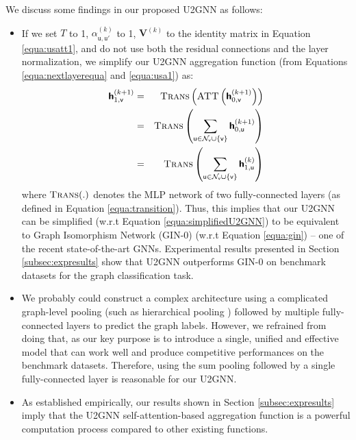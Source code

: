 \documentclass[twoside,leqno,twocolumn]{article}
\newcommand{\citep}{\cite}
\begin{document}
We discuss some findings in our proposed U2GNN as follows:

\begin{itemize}


\item If we set $T$ to 1, $\alpha^{(k)}_{\mathsf{u},\mathsf{u}'}$ to 1, $\boldsymbol{V}^{(k)}$ to the identity matrix in Equation \ref{equa:usatt1}, and do not use both the residual connections and the layer normalization, we simplify our U2GNN aggregation function (from Equations \ref{equa:nextlayerequa} and \ref{equa:usa1}) as:
\begin{eqnarray} 
\boldsymbol{\mathsf{h}}^{(k+1)}_{1,\mathsf{v}} &=&  \textsc{Trans}\left( \textsc{ATT}\left(\boldsymbol{\mathsf{h}}^{(k+1)}_{0,\mathsf{v}}\right)\right) \nonumber \\
&=& \textsc{Trans}\left(\sum_{\mathsf{u} \in \mathcal{N}_\mathsf{v}\cup\left\{\mathsf{v}\right\}}\boldsymbol{\mathsf{h}}^{(k+1)}_{0,\mathsf{u}}\right) \nonumber \\ 
&=& \textsc{Trans}\left(\sum_{\mathsf{u} \in \mathcal{N}_\mathsf{v}\cup\left\{\mathsf{v}\right\}}\boldsymbol{\mathsf{h}}^{(k)}_{1,\mathsf{u}}\right)
\label{equa:simplifiedU2GNN}
\end{eqnarray}
where $\textsc{Trans}(.)$ denotes the MLP network of two fully-connected layers (as defined in Equation \ref{equa:transition}). Thus, this implies that our U2GNN can be simplified (w.r.t Equation \ref{equa:simplifiedU2GNN}) to be equivalent to Graph Isomorphism Network (GIN-0) \citep{xu2019powerful} (w.r.t Equation \ref{equa:gin}) -- one of the recent state-of-the-art GNNs.
Experimental results presented in Section \ref{subsec:expresults} show that U2GNN outperforms GIN-0 on benchmark datasets for the graph classification task.


\item We probably could construct a complex architecture using a complicated graph-level pooling (such as hierarchical pooling \citep{cangea2018towards}) followed by multiple fully-connected layers \citep{Chen2019ArePG,maron2019invariant} to predict the graph labels.
However, we refrained from doing that, as our key purpose is to introduce a single, unified and effective model that can work well and produce competitive performances on the benchmark datasets. 
Therefore, using the sum pooling followed by a single fully-connected layer is reasonable for our U2GNN.

\item As established empirically, our results shown in Section \ref{subsec:expresults} imply that the U2GNN self-attention-based aggregation function is a powerful computation process compared to other existing functions.

\end{itemize}
\end{document}
